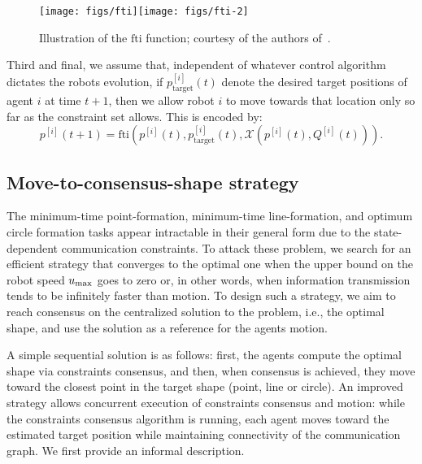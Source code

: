 \documentclass[onecolumn,journal,letterpaper]{IEEEtran}
\newcommand{\subscr}[2]{{#1}_{\textup{#2}}}
\newcommand{\umax}{\subscr{r}{ctr}}
\renewcommand{\umax}{\subscr{u}{max}}
\newcommand{\XX}{\mathcal{X}}
\newcommand{\fti}{\text{fti}}
\newcommand{\supind}[2]{{#1}^{[#2]}}
\begin{document}
\begin{figure}[h]
\begin{center}
\texttt{[image: figs/fti]}\texttt{[image: figs/fti-2]}\caption{Illustration of the $\fti$ function; courtesy of the authors
    of~\cite{FB-JC-SM:09}.}
  \label{fig:fti}
\end{center}
\end{figure}

Third and final, we assume that, independent of whatever control algorithm
dictates the robots evolution, if $\supind{p}{i}_{\text{target}}(t)$ denote
the desired target positions of agent $i$ at time $t+1$, then we allow
robot $i$ to move towards that location only so far as the constraint set
allows. This is encoded by:
\begin{equation*}
  \supind{p}{i}(t+1) = \fti(\supind{p}{i}(t),
  \supind{p}{i}_{\text{target}}(t), \XX(\supind{p}{i}(t),
  \supind{Q}{i}(t))) .
\end{equation*}


\subsection{Move-to-consensus-shape strategy}
The minimum-time point-formation, minimum-time line-formation, and optimum
circle formation tasks appear intractable in their general form due to the
state-dependent communication constraints.  To attack these problem, we
search for an efficient strategy that converges to the optimal one when the
upper bound on the robot speed $\umax$ goes to zero or, in other words,
when information transmission tends to be infinitely faster than motion.
To design such a strategy, we aim to reach consensus on the centralized
solution to the problem, i.e., the optimal shape, and use the solution as a
reference for the agents motion.

A simple sequential solution is as follows: first, the agents compute the
optimal shape via constraints consensus, and then, when consensus is
achieved, they move toward the closest point in the target shape (point,
line or circle).  An improved strategy allows concurrent execution of
constraints consensus and motion: while the constraints consensus algorithm
is running, each agent moves toward the estimated target position while
maintaining connectivity of the communication graph. We first provide an
informal description.
\end{document}
